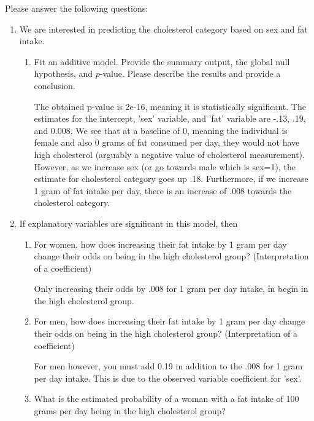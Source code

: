 \documentclass[12pt,letterpaper]{article}
\begin{document}
\newpage
\noindent Please answer the following questions:

\begin{enumerate}
	\item
	We are interested in predicting the cholesterol category based on sex and fat intake.
	\begin{enumerate}
		\item
		Fit an additive model. Provide the summary output, the global null hypothesis, and $p$-value. Please describe the results and provide a conclusion.
		
\vspace{.5cm}
  
\vspace{.5cm}

The obtained p-value is 2e-16, meaning it is statistically significant. The estimates for the intercept, 'sex' variable, and 'fat' variable are -.13, .19, and 0.008. We see that at a baseline of 0, meaning the individual is female and also 0 grams of fat consumed per day, they would not have high cholesterol (arguably a negative value of cholesterol measurement). However, as we increase sex (or go towards male which is sex=1), the estimate for cholesterol category goes up .18. Furthermore, if we increase 1 gram of fat intake per day, there is an increase of .008 towards the cholesterol category.  
	\end{enumerate}
	
	\item
	If explanatory variables are significant in this model, then
	\begin{enumerate}
		\item
		For women, how does increasing their fat intake by 1 gram per day change their odds on being in the high cholesterol group? (Interpretation of a coefficient)
		
Only increasing their odds by .008 for 1 gram per day intake, in begin in the high cholesterol group.	
		\item
		For men, how does increasing their fat intake by 1 gram per day change their odds on being in the high cholesterol group? (Interpretation of a coefficient)
		
For men however, you must add 0.19 in addition to the .008 for 1 gram per day intake. This is due to the observed variable coefficient for 'sex'. 
		\item
		What is the estimated probability of a woman with a fat intake of 100 grams per day being in the high cholesterol group? 
		

\end{enumerate}
\end{enumerate}
\end{document}
